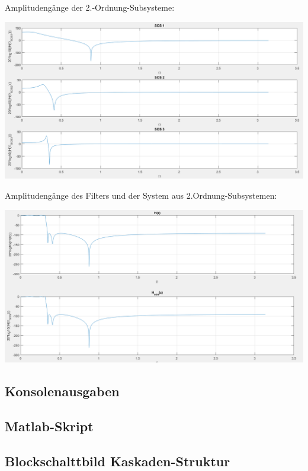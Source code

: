 Amplitudengänge der 2.-Ordnung-Subsysteme:
\begin{center}
\includegraphics[scale=0.52]{UE02_2_SOS123_amp.png}
\end{center}

Amplitudengänge des Filters und der System aus 2.Ordnung-Subsystemen:
\begin{center}
\includegraphics[scale=0.52]{UE02_2_H_H_sos_amp.png}
\end{center}

\newpage

\subsection{Konsolenausgaben}


\newpage

\subsection{Matlab-Skript}


\subsection{Blockschalttbild Kaskaden-Struktur}

